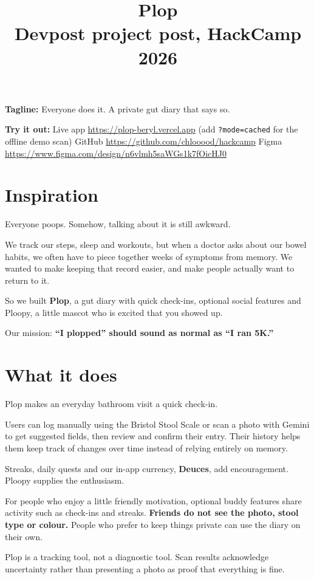 \documentclass[11pt]{article}
\title{\textbf{Plop}\\[0.2em]\large Devpost project post, HackCamp 2026}
\date{}
\begin{document}
\maketitle

\textbf{Tagline:} Everyone does it. A private gut diary that says so.

\textbf{Try it out:} Live app \url{https://plop-beryl.vercel.app} (add \texttt{?mode=cached} for the offline demo scan) \quad GitHub \url{https://github.com/chlooood/hackcamp} \quad Figma \url{https://www.figma.com/design/n6vlmh5saWGs1k7fOicHJ0}

\section*{Inspiration}

Everyone poops. Somehow, talking about it is still awkward.

We track our steps, sleep and workouts, but when a doctor asks about our bowel habits, we often have to piece together weeks of symptoms from memory. We wanted to make keeping that record easier, and make people actually want to return to it.

So we built \textbf{Plop}, a gut diary with quick check-ins, optional social features and Ploopy, a little mascot who is excited that you showed up.

Our mission: \textbf{``I plopped'' should sound as normal as ``I ran 5K.''}

\section*{What it does}

Plop makes an everyday bathroom visit a quick check-in.

Users can log manually using the Bristol Stool Scale or scan a photo with Gemini to get suggested fields, then review and confirm their entry. Their history helps them keep track of changes over time instead of relying entirely on memory.

Streaks, daily quests and our in-app currency, \textbf{Deuces}, add encouragement. Ploopy supplies the enthusiasm.

For people who enjoy a little friendly motivation, optional buddy features share activity such as check-ins and streaks. \textbf{Friends do not see the photo, stool type or colour.} People who prefer to keep things private can use the diary on their own.

Plop is a tracking tool, not a diagnostic tool. Scan results acknowledge uncertainty rather than presenting a photo as proof that everything is fine.
\end{document}
